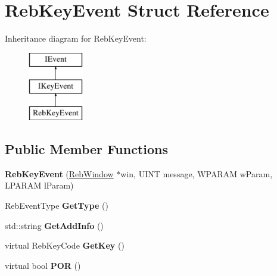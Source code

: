 \hypertarget{class_reb_key_event}{}\section{Reb\+Key\+Event Struct Reference}
\label{class_reb_key_event}
Inheritance diagram for Reb\+Key\+Event\+:\begin{figure}[H]
\begin{center}
\leavevmode
\includegraphics[height=3.000000cm]{class_reb_key_event}
\end{center}
\end{figure}
\subsection*{Public Member Functions}
\begin{DoxyCompactItemize}
\item 
{\bfseries Reb\+Key\+Event} (\hyperlink{class_reb_window}{Reb\+Window} $\ast$win, U\+I\+NT message, W\+P\+A\+R\+AM w\+Param, L\+P\+A\+R\+AM l\+Param)\hypertarget{class_reb_key_event_adb0238c0ed84e20f6ea70eba726d5058}{}\label{class_reb_key_event_adb0238c0ed84e20f6ea70eba726d5058}

\item 
Reb\+Event\+Type {\bfseries Get\+Type} ()\hypertarget{class_reb_key_event_aa3a5d8eb104fda8a5732b1b4e96e11cb}{}\label{class_reb_key_event_aa3a5d8eb104fda8a5732b1b4e96e11cb}

\item 
std\+::string {\bfseries Get\+Add\+Info} ()\hypertarget{class_reb_key_event_a79c8b9af7783bfa7b14577d112fb9707}{}\label{class_reb_key_event_a79c8b9af7783bfa7b14577d112fb9707}

\item 
virtual Reb\+Key\+Code {\bfseries Get\+Key} ()\hypertarget{class_reb_key_event_abfbed153fad0cd4164f619652fc5a16f}{}\label{class_reb_key_event_abfbed153fad0cd4164f619652fc5a16f}

\item 
virtual bool {\bfseries P\+OR} ()\hypertarget{class_reb_key_event_ace1795eada34da3484968b9468843b1e}{}\label{class_reb_key_event_ace1795eada34da3484968b9468843b1e}

\end{DoxyCompactItemize}
